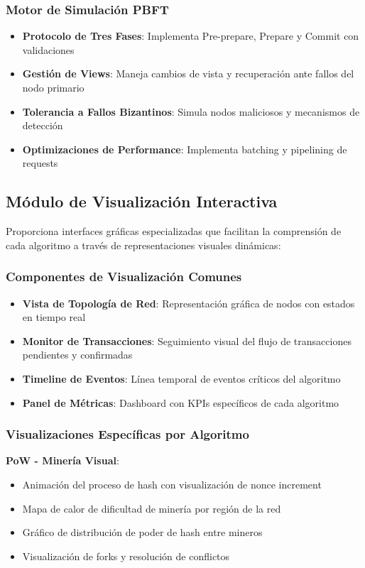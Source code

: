 \documentclass[spanish,12pt,letterpaper]{report}
\begin{document}
\subsubsection{Motor de Simulación PBFT}
\begin{itemize}
    \item \textbf{Protocolo de Tres Fases}: Implementa Pre-prepare, Prepare y Commit con validaciones
    \item \textbf{Gestión de Views}: Maneja cambios de vista y recuperación ante fallos del nodo primario
    \item \textbf{Tolerancia a Fallos Bizantinos}: Simula nodos maliciosos y mecanismos de detección
    \item \textbf{Optimizaciones de Performance}: Implementa batching y pipelining de requests
\end{itemize}

\subsection{Módulo de Visualización Interactiva}

Proporciona interfaces gráficas especializadas que facilitan la comprensión de cada algoritmo a través de representaciones visuales dinámicas:

\subsubsection{Componentes de Visualización Comunes}
\begin{itemize}
    \item \textbf{Vista de Topología de Red}: Representación gráfica de nodos con estados en tiempo real
    \item \textbf{Monitor de Transacciones}: Seguimiento visual del flujo de transacciones pendientes y confirmadas
    \item \textbf{Timeline de Eventos}: Línea temporal de eventos críticos del algoritmo
    \item \textbf{Panel de Métricas}: Dashboard con KPIs específicos de cada algoritmo
\end{itemize}

\subsubsection{Visualizaciones Específicas por Algoritmo}

\textbf{PoW - Minería Visual}:
\begin{itemize}
    \item Animación del proceso de hash con visualización de nonce increment
    \item Mapa de calor de dificultad de minería por región de la red
    \item Gráfico de distribución de poder de hash entre mineros
    \item Visualización de forks y resolución de conflictos
\end{itemize}
\end{document}
